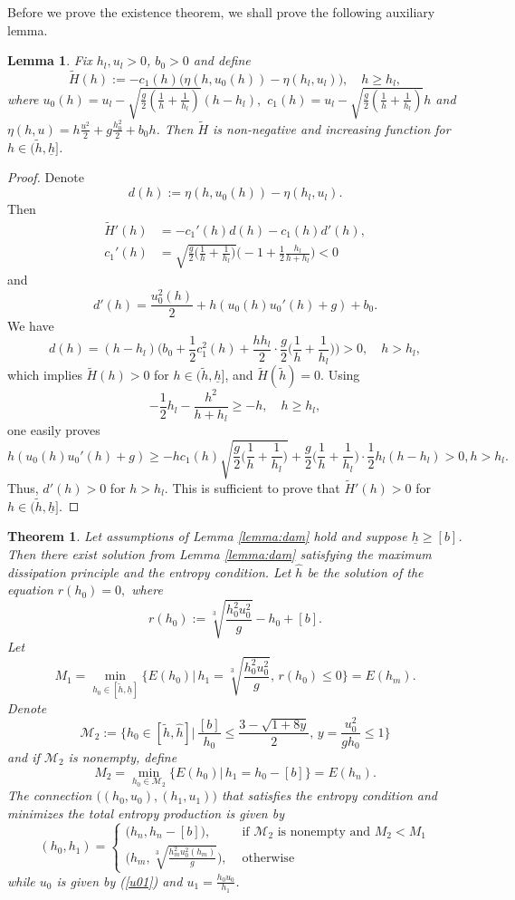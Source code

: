 \documentclass{article}
\theoremstyle{plain}
\newtheorem{theorem}{Theorem}[section]
\newtheorem{lemma}{Lemma}[section]
\theoremstyle{definition}
\theoremstyle{remark}
\begin{document}
Before we prove the existence theorem, we shall prove the following auxiliary lemma.
\begin{lemma}\label{lemma_H}
Fix $h_l,u_l>0$, $b_0>0$ and define
\[\tilde{H}(h):=-c_1(h)\big(\eta(h,u_0(h))-\eta(h_l,u_l)\big), \quad h\geq h_l,\]
where $u_0(h)=u_{l} - \sqrt{\frac{g}{2} \left( \frac{1}{h} + \frac{1}{h_{l}} \right)}
\left( h - h_{l} \right),$
$c_1(h)= u_{l} - \sqrt{\frac{g}{2} \left( \frac{1}{h} + \frac{1}{h_{l}} \right)}
h$ and $\eta(h,u)=h\frac{u^2}{2}+g\frac{h_0^2}{2}+b_0h$.
Then $\tilde{H}$ is non-negative and increasing function for $h\in(\tilde{h},\underline{h}]$.
\end{lemma}
\begin{proof}
Denote
\[d(h):=\eta(h,u_0(h))-\eta(h_l,u_l).\]
Then
\[\begin{split}
\tilde{H}'(h)&=-c_1'(h)d(h)-c_1(h)d'(h),\\
c_1'(h)&=\sqrt{\frac{g}{2}\Big(\frac{1}{h}+\frac{1}{h_l}\Big)}
\Big(-1+\frac{1}{2}\frac{h_l}{h+h_l}\Big)<0
\end{split}\]
and
\[
d'(h)=\frac{u_0^2(h)}{2}+h(u_0(h)u_0'(h)+g)+b_0.
\]
We have 
\[d(h)=(h-h_l)\Big(b_0+\frac{1}{2}c_1^2(h)+\frac{hh_l}{2}\cdot\frac{g}{2}
\Big(\frac{1}{h}+\frac{1}{h_l}\Big)\Big)>0, \quad h>h_l,\]
which implies $\tilde{H}(h)> 0$ for $h\in(\tilde{h},\underline{h}]$, 
and $\tilde{H}(\tilde{h})=0$. Using  
\[-\frac{1}{2}h_l-\frac{h^2}{h+h_l}\geq -h, \quad h\geq h_l,\]
one easily proves 
\[h(u_0(h)u_0'(h)+g)\geq -hc_1(h)\sqrt{\frac{g}{2}
\Big(\frac{1}{h}+\frac{1}{h_l}\Big)}+\frac{g}{2}\Big(\frac{1}{h}+\frac{1}{h_l}\Big)
\cdot \frac{1}{2}h_l(h-h_l)> 0, h>h_l.\]
Thus, $d'(h)>0$ for $h>h_l$. This is sufficient to prove that 
$\tilde{H}'(h)>0$ for $h\in(\tilde{h},\underline{h}].$
\end{proof}

\begin{theorem}
Let assumptions of Lemma \ref{lemma:dam} hold 
and suppose $\underline{h}\geq [b]$.
Then there exist solution from Lemma \ref{lemma:dam}
satisfying the maximum dissipation principle and the entropy condition. 
Let
$\hat{h}$ be the solution of the equation $r(h_0)=0,$ where
\[r(h_0):=\sqrt[3]{\frac{h_0^2u_0^2}{g}}-h_0+[b].\]
Let
\[M_1=\min_{h_0\in[\tilde{h},\underline{h}]}\Big\{E(h_0)\Big|
\,h_1=\sqrt[3]{\frac{h_0^2u_0^2}{g}},\,r(h_0)\leq 0\Big\}=E(h_m).\]
Denote 
\[\mathcal{M}_2:=\Big\{h_0\in[\tilde{h},\hat{h}]\Big|\,
\frac{[b]}{h_0}\leq\frac{3-\sqrt{1+8y}}{2},\,y=\frac{u_0^2}{gh_0}\leq 1\Big\}\]
and if $\mathcal{M}_2$ is nonempty, 
define
\[M_2=\min_{h_0\in \mathcal{M}_2}\Big\{E(h_0)\Big|\,h_1=h_0-[b]\Big\}=E(h_n).\]
The connection $\big((h_0,u_0),(h_1,u_1)\big)$ that satisfies the entropy condition
and minimizes the total entropy production is given by
\[(h_0,h_1)=\begin{cases}
\big(h_n,h_n-[b]\big), &\text{ if } \mathcal{M}_2 \text{ is nonempty and }  M_2<M_1\\
\big(h_m,\sqrt[3]{\frac{h_m^2u_0^2(h_m)}{g}}\big), & \text{ otherwise}
\end{cases}\] 
while $u_0$ is given by (\ref{u01}) and $u_1=\frac{h_0u_0}{h_1}$. 
\end{theorem}
\end{document}
